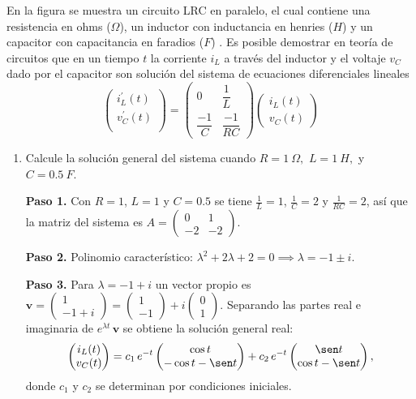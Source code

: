 \begin{prob}
En la figura se muestra un circuito LRC en paralelo, el cual contiene una resistencia en ohms ($\Omega$), un inductor con inductancia en henries ($H$) y un capacitor con capacitancia en faradios ($F$) . Es posible demostrar en teoría de circuitos que en un tiempo $t$ la corriente $i_{L}$ a través del inductor y el voltaje $v_{C}$ dado por el capacitor son solución del sistema de ecuaciones diferenciales lineales
\[ \begin{pmatrix}
i_{L}^{\prime}(t)\\v_{C}^{\prime}(t)\\
\end{pmatrix} =\begin{pmatrix} 0&\dfrac{1}{L} \\ \dfrac{-1}{C} & \dfrac{-1}{RC}
\end{pmatrix} \begin{pmatrix} i_{L} (t)\\v_{C}(t)  \end{pmatrix} \]
\begin{enumerate}[$(a)$]
\item Calcule la solución general del sistema cuando $R=1\ \Omega,$ $L=1\ H,$ y $C=0.5\ F.$
\begin{myproof}
\textbf{Paso 1.} Con $R=1$, $L=1$ y $C=0.5$ se tiene $\tfrac{1}{L}=1$, $\tfrac{1}{C}=2$ y $\tfrac{1}{RC}=2$, así que la matriz del sistema es $A = \begin{pmatrix} 0 & 1 \\ -2 & -2 \end{pmatrix}$.

\textbf{Paso 2.} Polinomio característico: $\lambda^2 + 2\lambda + 2 = 0 \implies \lambda = -1 \pm i$.

\textbf{Paso 3.} Para $\lambda = -1+i$ un vector propio es $\mathbf{v} = \begin{pmatrix} 1 \\ -1+i \end{pmatrix} = \begin{pmatrix} 1 \\ -1 \end{pmatrix} + i\begin{pmatrix} 0 \\ 1 \end{pmatrix}$. Separando las partes real e imaginaria de $e^{\lambda t}\,\mathbf{v}$ se obtiene la solución general real:
\[
\begin{pmatrix} i_L(t) \\ v_C(t) \end{pmatrix}
= c_1\, e^{-t}\begin{pmatrix} \cos t \\ -\cos t - \sen t \end{pmatrix}
+ c_2\, e^{-t}\begin{pmatrix} \sen t \\ \cos t - \sen t \end{pmatrix},
\]
donde $c_1$ y $c_2$ se determinan por condiciones iniciales.
\end{myproof}


\end{enumerate}
\end{prob}
